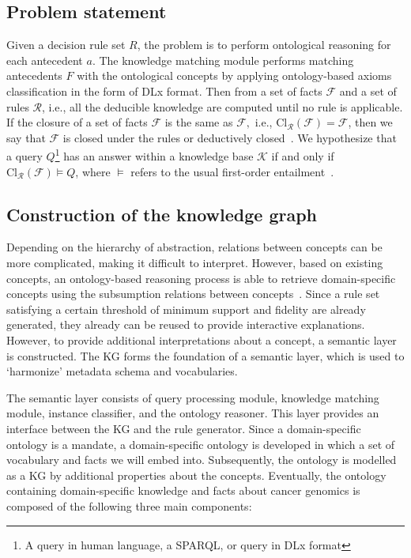 \subsection{Problem statement}
Given a decision rule set $R$, the problem is to perform ontological reasoning for each antecedent $a$. The knowledge matching module performs matching antecedents $F$ with the ontological concepts by applying ontology-based axioms classification in the form of DLx format. %
Then from a set of facts $\mathcal{F}$ and a set of rules $\mathcal{R}$, i.e., all the deducible knowledge are computed until no rule is applicable. If the closure of a set of facts $\mathcal{F}$ is the same as $\mathcal{F},$ i.e., $\mathrm{Cl}_{\mathcal{R}}(\mathcal{F})=\mathcal{F}$, then we say that $\mathcal{F}$ is closed under the rules or deductively closed~\cite{garoufallou2016metadata}. We hypothesize that a query $Q$\footnote{A query in human language, a SPARQL, or query in DLx format} has an answer within a knowledge base $\mathcal{K}$ if and only if $\mathrm{Cl}_{\mathcal{R}}(\mathcal{F}) \models Q$, where $\models$ refers to the usual first-order entailment~\cite{garoufallou2016metadata}. 

\subsection{Construction of the knowledge graph}
Depending on the hierarchy of abstraction, relations between concepts can be more complicated, making it difficult to interpret. However, based on existing concepts, an ontology-based reasoning process is able to retrieve  domain-specific concepts using the subsumption relations between concepts~\cite{alirezaie2019semantic}. Since a rule set satisfying a certain threshold of minimum support and fidelity are already generated, they already can be reused to provide interactive explanations. However, to provide additional interpretations about a concept, a semantic layer is constructed. The KG forms the foundation of a semantic layer, which is used to `harmonize' metadata schema and vocabularies.

\hspace*{3.5mm} The semantic layer consists of query processing module, knowledge matching module, instance classifier, and the ontology reasoner. This layer provides an interface between the KG and the rule generator. Since a domain-specific ontology is a mandate, a domain-specific ontology is developed in which a set of vocabulary and facts we will embed into. Subsequently, the ontology is modelled as a KG by additional properties about the concepts. Eventually, the ontology containing domain-specific knowledge and facts about cancer genomics is composed of the following three main components:

